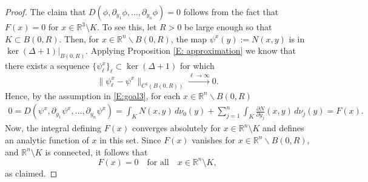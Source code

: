 \documentclass[11pt,reqno]{amsart}
\newcommand{\R}{{\mathbb R}}
\theoremstyle{definition}
\begin{document}
\begin{proof}
The claim that $D(\phi, \partial_{y_1} \phi, \dots,  \partial_{y_n} \phi ) =0$  follows from the fact that   $F(x)=0$ for $x\in\R^3\setminus K$.  To see this,
 let  $R>0$ be large enough so that $K\subset B(0,R)$.  Then, for $x\in\R^n\backslash B(0,R)$, the map $\psi^x(y):=N(x,y)$ is in $\ker(\Delta+1)\vert_{B(0,R)}$. Applying  Proposition \ref{E: approximation}  we know that  there exists a sequence $\{\psi_\ell^x\}_{\ell} \subset \ker(\Delta+1)$ for which
\[\|\psi_\ell^x - \psi^x\|_{C^1(B(0, R))} \overset{\ell\to \infty}{\longrightarrow} 0.\] 
Hence, by the assumption in  \eqref{E:goal3},  for each $x\in\R^n\backslash B(0,R)$
\begin{align}
 0=D(\psi^x, \partial_{y_1} \psi^x, \dots,  \partial_{y_n} \psi^x)
 =\int_K N(x,y)\, d\nu_0(y) + \sum_{j=1}^n \int_K \frac{\partial N}{\partial y_j}(x,y)\, d\nu_j(y)=F(x). \label{E:F}
\end{align}
Now, the integral defining $F(x)$ converges absolutely for $x\in \R^n\setminus K$ and defines an analytic function of $x$ in this set. Since $F(x)$ vanishes for $x\in\R^n\backslash B(0,R)$, and $\R^n\setminus K$ is connected, it follows that 
\[F(x)=0 \quad \text{for all}\quad  x\in\R^n\setminus K,\]
as claimed.

\end{proof}
\end{document}

